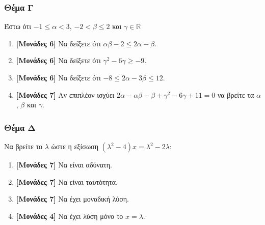 \documentclass[12pt]{article}
\begin{document}
\section*{Θέμα Γ}
  \noindent
  Έστω ότι $-1\le α<3$, $-2<β\le 2$ και $γ\in\mathbb{R}$
  \begin{enumerate}
    \item \textbf{[Μονάδες 6]} Να δείξετε ότι $αβ-2\le 2α-β$.
    \item \textbf{[Μονάδες 6]} Να δείξετε ότι $γ^2-6γ \ge -9$.
    \item \textbf{[Μονάδες 6]} Να δείξετε ότι $-8\le 2α-3β \le 12$.
    \item \textbf{[Μονάδες 7]} Αν επιπλέον ισχύει $2α-αβ-β+γ^2-6γ+11=0$ να βρείτε τα $α$, $β$ και $γ$.
  \end{enumerate}

\section*{Θέμα Δ}
  \noindent
  Να βρείτε το $λ$ ώστε η εξίσωση $(λ^2-4)x=λ^2-2λ$:
  \begin{enumerate}
    \item \textbf{[Μονάδες 7]} Να είναι αδύνατη.
    \item \textbf{[Μονάδες 7]} Να είναι ταυτότητα.
    \item \textbf{[Μονάδες 7]} Να έχει μοναδική λύση.
    \item \textbf{[Μονάδες 4]} Να έχει λύση μόνο το $x=λ$.
  \end{enumerate}

\vspace{3\baselineskip}

\part*{}
\end{document}
